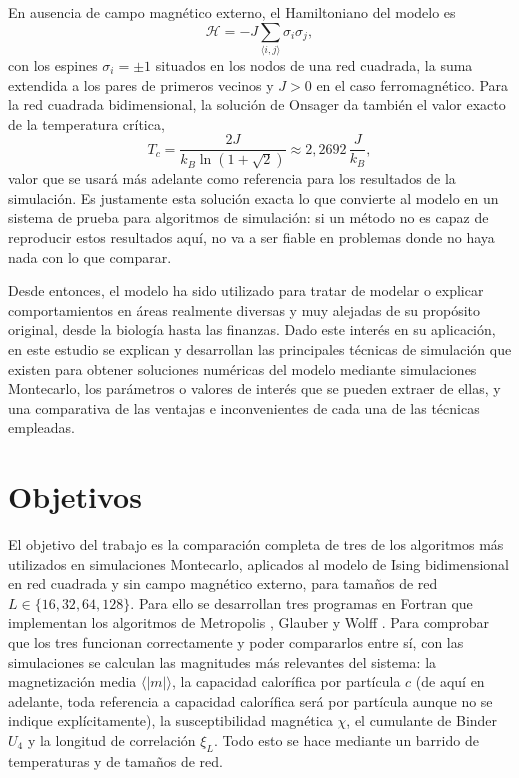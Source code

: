 En ausencia de campo magnético externo, el Hamiltoniano del modelo es
\begin{equation}
\mathcal{H} = -J \sum_{\langle i,j \rangle} \sigma_i \sigma_j,
\label{eq:hamiltonian}
\end{equation}
con los espines $\sigma_i = \pm 1$ situados en los nodos de una red cuadrada, la suma extendida a los pares de primeros vecinos y $J > 0$ en el caso ferromagnético. Para la red cuadrada bidimensional, la solución de Onsager da también el valor exacto de la temperatura crítica,
\begin{equation}
T_c = \frac{2J}{k_B \ln(1+\sqrt{2})} \approx 2{,}2692\,\frac{J}{k_B},
\label{eq:Tc_onsager}
\end{equation}
valor que se usará más adelante como referencia para los resultados de la simulación. Es justamente esta solución exacta lo que convierte al modelo en un sistema de prueba para algoritmos de simulación: si un método no es capaz de reproducir estos resultados aquí, no va a ser fiable en problemas donde no haya nada con lo que comparar.

Desde entonces, el modelo ha sido utilizado para tratar de modelar o explicar comportamientos en áreas realmente diversas y muy alejadas de su propósito original, desde la biología hasta las finanzas. Dado este interés en su aplicación, en este estudio se explican y desarrollan las principales técnicas de simulación que existen para obtener soluciones numéricas del modelo mediante simulaciones Montecarlo, los parámetros o valores de interés que se pueden extraer de ellas, y una comparativa de las ventajas e inconvenientes de cada una de las técnicas empleadas.

\section{Objetivos}
El objetivo del trabajo es la comparación completa de tres de los algoritmos más utilizados en simulaciones Montecarlo, aplicados al modelo de Ising bidimensional en red cuadrada y sin campo magnético externo, para tamaños de red $L \in \{16, 32, 64, 128\}$. Para ello se desarrollan tres programas en Fortran que implementan los algoritmos de Metropolis \citep{Metropolis1953}, Glauber \citep{Glauber1963} y Wolff \citep{Wolff1989}. Para comprobar que los tres funcionan correctamente y poder compararlos entre sí, con las simulaciones se calculan las magnitudes más relevantes del sistema: la magnetización media $\langle|m|\rangle$, la capacidad calorífica por partícula $c$ (de aquí en adelante, toda referencia a capacidad calorífica será por partícula aunque no se indique explícitamente), la susceptibilidad magnética $\chi$, el cumulante de Binder $U_4$ y la longitud de correlación $\xi_L$. Todo esto se hace mediante un barrido de temperaturas y de tamaños de red.

